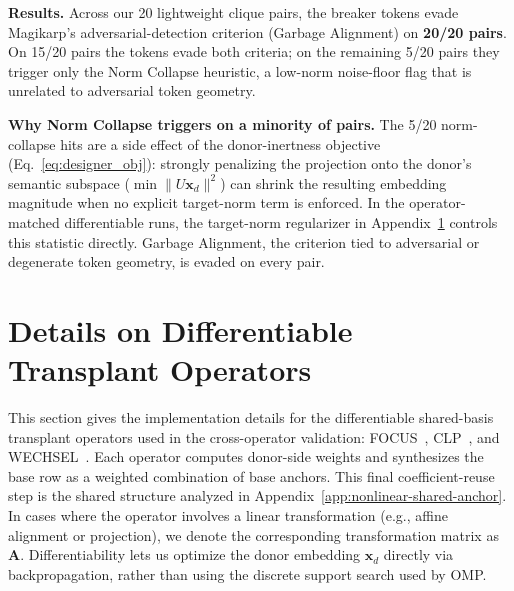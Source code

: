\documentclass{article}
\theoremstyle{plain}
\theoremstyle{definition}
\theoremstyle{remark}
\begin{document}
\noindent\textbf{Results.}
Across our 20 lightweight clique pairs, the breaker tokens evade Magikarp's adversarial-detection criterion (Garbage Alignment) on \textbf{20/20 pairs}. On 15/20 pairs the tokens evade both criteria; on the remaining 5/20 pairs they trigger only the Norm Collapse heuristic, a low-norm noise-floor flag that is unrelated to adversarial token geometry.

\noindent\textbf{Why Norm Collapse triggers on a minority of pairs.}
The 5/20 norm-collapse hits are a side effect of the donor-inertness objective (Eq.~\ref{eq:designer_obj}): strongly penalizing the projection onto the donor's semantic subspace ($\min \|U \mathbf{x}_d\|^2$) can shrink the resulting embedding magnitude when no explicit target-norm term is enforced. In the operator-matched differentiable runs, the target-norm regularizer in Appendix~\ref{app:designers} controls this statistic directly. Garbage Alignment, the criterion tied to adversarial or degenerate token geometry, is evaded on every pair.






















\section{Details on Differentiable Transplant Operators}
\label{app:designers}

This section gives the implementation details for the differentiable shared-basis transplant operators used in the cross-operator validation: FOCUS~\citep{dobler2023focus}, CLP~\citep{ostendorff2023efficient}, and WECHSEL~\citep{minixhofer2021wechsel}.
Each operator computes donor-side weights and synthesizes the base row as a weighted combination of base anchors. This final coefficient-reuse step is the shared structure analyzed in Appendix~\ref{app:nonlinear-shared-anchor}.
In cases where the operator involves a linear transformation (e.g., affine alignment or projection), we denote the corresponding transformation matrix as $\mathbf{A}$.
Differentiability lets us optimize the donor embedding $\mathbf{x}_d$ directly via backpropagation, rather than using the discrete support search used by OMP.
\end{document}

